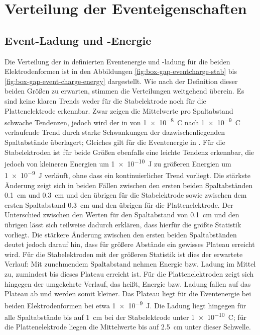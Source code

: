 \section{Verteilung der Eventeigenschaften}
\label{sec:event_value_distribution}

\subsection{Event-Ladung und -Energie}
\label{sec:event_charge_energie}
Die Verteilung der in  definierten Eventenergie und -ladung für die beiden Elektrodenformen ist in den Abbildungen \ref{fig:box-gap-eventcharge-stab} bis \ref{fig:box-gap-event-charge-energy} dargestellt. Wie nach der Definition dieser beiden Größen zu erwarten, stimmen die Verteilungen weitgehend überein. Es sind keine klaren Trends weder für die Stabelektrode noch für die Plattenelektrode erkennbar. Zwar zeigen die Mittelwerte pro Spaltabstand schwache Tendenzen, jedoch wird der in  von \SI{1e-8}{\coulomb} nach \SI{1e-9}{\coulomb} verlaufende Trend durch starke Schwankungen der dazwischenliegenden Spaltabstände überlagert; Gleiches gilt für die Eventenergie in . Für die Stabelektroden ist für beide Größen ebenfalls eine leichte Tendenz erkennbar, die jedoch von kleineren Energien um \SI{1e-10}{\joule} zu größeren Energien um \SI{1e-9}{\joule} verläuft, ohne dass ein kontinuierlicher Trend vorliegt. Die stärkste Änderung zeigt sich in beiden Fällen zwischen den ersten beiden Spaltabständen \SI{0.1}{\centi\meter} und \SI{0.3}{\centi\meter} und den übrigen für die Stabelektrode sowie zwischen dem ersten Spaltabstand \SI{0.3}{\centi\meter} und den übrigen für die Plattenelektrode. Der Unterschied zwischen den Werten für den Spaltabstand von \SI{0.1}{\centi\meter} und den übrigen lässt sich teilweise dadurch erklären, dass hierfür die größte Statistik vorliegt. Die stärkere Änderung zwischen den ersten beiden Spaltabständen deutet jedoch darauf hin, dass für größere Abstände ein gewisses Plateau erreicht wird. Für die Stabelektroden mit der größeren Statistik ist dies der erwartete Verlauf: Mit zunehmendem Spaltabstand nehmen Energie bzw. Ladung im Mittel zu, zumindest bis dieses Plateau erreicht ist. Für die Plattenelektroden zeigt sich hingegen der umgekehrte Verlauf, das heißt, Energie bzw. Ladung fallen auf das Plateau ab und werden somit kleiner. Das Plateau liegt für die Eventenergie bei beiden Elektrodenformen bei etwa \SI{1e-9}{\joule}. Die Ladung liegt hingegen für alle Spaltabstände bis auf \SI{1}{\centi\meter} bei der Stabelektrode unter \SI{1e-10}{\coulomb}; für die Plattenelektrode liegen die Mittelwerte bis auf \SI{2.5}{\centi\meter} unter dieser Schwelle.

